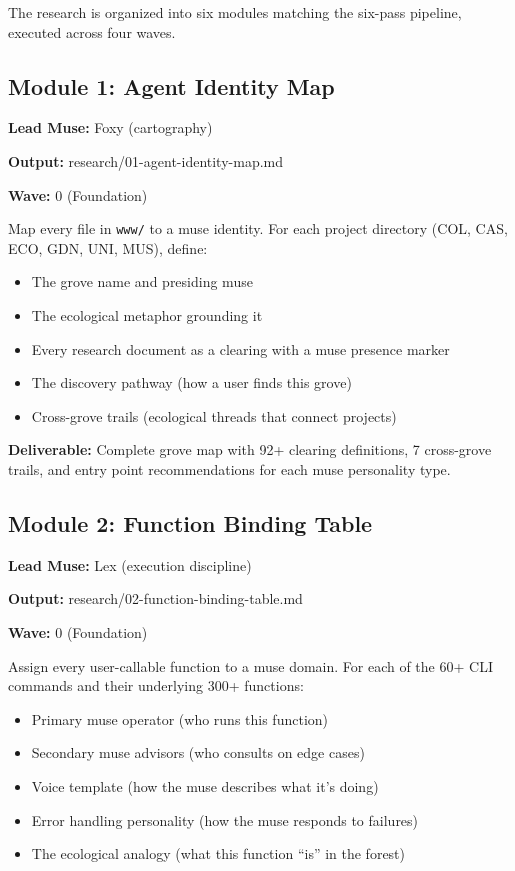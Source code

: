 \documentclass[11pt,letterpaper]{article}
\newcommand{\metafield}[2]{\textbf{\sffamily #1} #2\par}
\begin{document}
The research is organized into six modules matching the six-pass pipeline, executed across four waves.

\subsection{Module 1: Agent Identity Map}

\metafield{Lead Muse:}{Foxy (cartography)}
\metafield{Output:}{research/01-agent-identity-map.md}
\metafield{Wave:}{0 (Foundation)}

Map every file in \texttt{www/} to a muse identity. For each project directory (COL, CAS, ECO, GDN, UNI, MUS), define:

\begin{itemize}
\item The grove name and presiding muse
\item The ecological metaphor grounding it
\item Every research document as a clearing with a muse presence marker
\item The discovery pathway (how a user finds this grove)
\item Cross-grove trails (ecological threads that connect projects)
\end{itemize}

\textbf{Deliverable:} Complete grove map with 92+ clearing definitions, 7 cross-grove trails, and entry point recommendations for each muse personality type.

\subsection{Module 2: Function Binding Table}

\metafield{Lead Muse:}{Lex (execution discipline)}
\metafield{Output:}{research/02-function-binding-table.md}
\metafield{Wave:}{0 (Foundation)}

Assign every user-callable function to a muse domain. For each of the 60+ CLI commands and their underlying 300+ functions:

\begin{itemize}
\item Primary muse operator (who runs this function)
\item Secondary muse advisors (who consults on edge cases)
\item Voice template (how the muse describes what it's doing)
\item Error handling personality (how the muse responds to failures)
\item The ecological analogy (what this function ``is'' in the forest)
\end{itemize}
\end{document}
